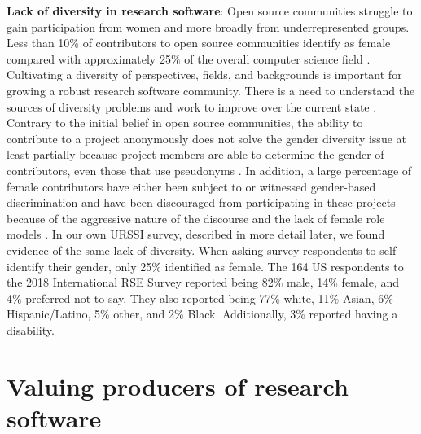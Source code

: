 \documentclass[
]{book}
\begin{document}
\textbf{Lack of diversity in research software}: Open source communities struggle to gain participation from women and more broadly from underrepresented groups. Less than 10\% of contributors to open source communities identify as female \citep{Lee2019} compared with approximately 25\% of the overall computer science field \citep{NSF2017, Vasilescu2012}. Cultivating a diversity of perspectives, ﬁelds, and backgrounds is important for growing a robust research software community. There is a need to understand the sources of diversity problems and work to improve over the current state \citep{Daniel2013}. Contrary to the initial belief in open source communities, the ability to contribute to a project anonymously does not solve the gender diversity issue \citep{Nafus2012} at least partially because project members are able to determine the gender of contributors, even those that use pseudonyms \citep{Vasilescu2015}. In addition, a large percentage of female contributors have either been subject to or witnessed gender-based discrimination \citep{Powell2010} and have been discouraged from participating in these projects because of the aggressive nature of the discourse and the lack of female role
models \citep{Reagle2012}.
In our own URSSI survey, described in more detail later, we found evidence of the same lack of diversity. When asking survey respondents to self-identify their gender, only 25\% identified as female.
The 164 US respondents to the 2018 International RSE Survey \citep{rse-survey} reported being 82\% male, 14\% female, and 4\% preferred not to say. They also reported being 77\% white, 11\% Asian, 6\% Hispanic/Latino, 5\% other, and 2\% Black. Additionally, 3\% reported having a disability.

\hypertarget{valuing-producers-of-research-software}{%
\section{Valuing producers of research software}\label{valuing-producers-of-research-software}}
\end{document}
